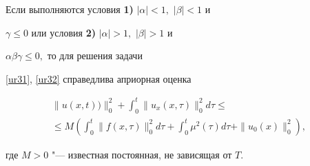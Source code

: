 \begin{theorem}[4]Если выполняются условия {\bf 1)} $|\alpha|<1,$ $|\beta|<1$ и

$\gamma\leq0$ или условия {\bf 2)} $|\alpha|>1,$ $|\beta|>1$ и

$\alpha\beta\gamma\leq0,$ то для решения задачи

\eqref{ur31}{\rm ,} \eqref{ur32} справедлива априорная оценка

\begin{multline}

\|u(x,t))\|_0^2+\int_{0}^{t}\|u_x(x,\tau)\|_0^2d\tau\leq

\\

\leq M\left(\int_{0}^{t}\|f(x,\tau)\|_0^2d\tau+\int_{0}^{t}\mu^2(\tau)d\tau+\|u_0(x)\|_0^2\right),

\label{ur37}

\end{multline}

где $M>0$ "--- известная постоянная, не зависящая от $T.$

\end{theorem}



\smallskip



